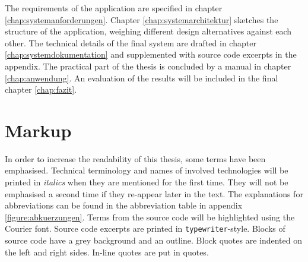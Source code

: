 The requirements of the application are specified in chapter \ref{chap:systemanforderungen}. Chapter \ref{chap:systemarchitektur} sketches the structure of the application, weighing different design alternatives against each other. The technical details of the final system are drafted in chapter \ref{chap:systemdokumentation} and supplemented with source code excerpts in the appendix. The practical part of the thesis is concluded by a manual in chapter \ref{chap:anwendung}. An evaluation of the results will be included in the final chapter \ref{chap:fazit}.

\section{Markup}

In order to increase the readability of this thesis, some terms have been emphasised. Technical terminology and names of involved technologies will be printed in \textit{italics} when they are mentioned for the first time. They will not be emphasised a second time if they re-appear later in the text. The explanations for abbreviations can be found in the abbreviation table in appendix \ref{figure:abkuerzungen}. Terms from the source code will be highlighted using the {\selectfont Courier} font. Source code excerpts are printed in \lstinline!typewriter!-style. Blocks of source code have a grey background and an outline. Block quotes are indented on the left and right sides. In-line quotes are put in quotes.